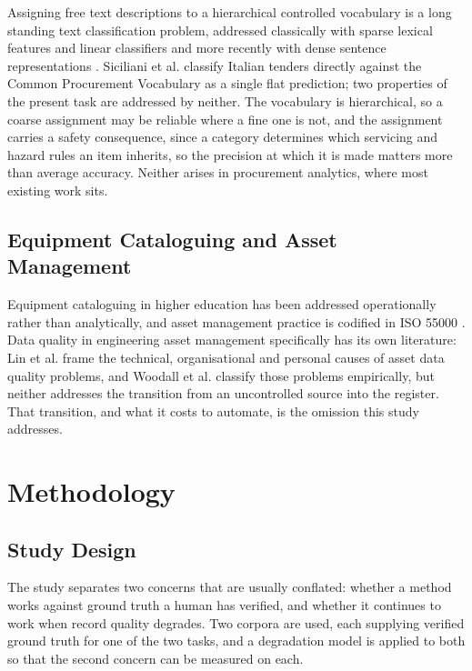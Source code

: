 \documentclass[conference]{IEEEtran}
\begin{document}
Assigning free text descriptions to a hierarchical controlled vocabulary
is a long standing text classification problem, addressed classically
with sparse lexical features and linear classifiers and more recently
with dense sentence representations \cite{reimers2019}. Siciliani et al.
\cite{siciliani2023cpv} classify Italian tenders directly against the
Common Procurement Vocabulary as a single flat prediction; two
properties of the present task are addressed by neither. The vocabulary
is hierarchical, so a coarse assignment may be reliable where a fine one
is not, and the assignment carries a safety consequence, since a
category determines which servicing and hazard rules an item inherits,
so the precision at which it is made matters more than average
accuracy. Neither arises in procurement analytics, where most existing
work sits.

\subsection{Equipment Cataloguing and Asset Management}

Equipment cataloguing in higher education has been addressed
operationally rather than analytically, and asset management practice
is codified in ISO 55000 \cite{iso55000}. Data quality in engineering
asset management specifically has its own literature: Lin et al.
\cite{lin2008dataquality} frame the technical,
organisational and personal causes of asset data quality problems, and
Woodall et al. \cite{woodall2015classifying} classify those problems
empirically, but neither addresses the transition from an uncontrolled
source into the register. That transition, and what it costs to
automate, is the omission this study addresses.

\section{Methodology}

\subsection{Study Design}

The study separates two concerns that are usually conflated: whether a
method works against ground truth a human has verified, and whether it
continues to work when record quality degrades. Two corpora are used,
each supplying verified ground truth for one of the two tasks, and a
degradation model is applied to both so that the second concern can be
measured on each.
\end{document}
